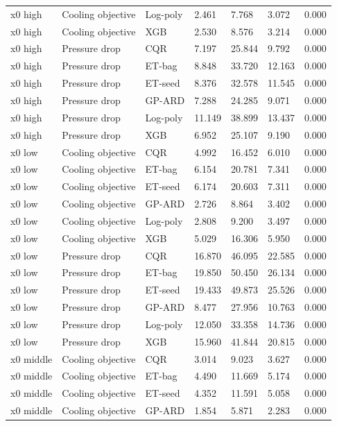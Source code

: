 \begin{longtable}{lllllll}
x0 high & Cooling objective & Log-poly & 2.461 & 7.768 & 3.072 & 0.000\\
x0 high & Cooling objective & XGB & 2.530 & 8.576 & 3.214 & 0.000\\
x0 high & Pressure drop & CQR & 7.197 & 25.844 & 9.792 & 0.000\\
x0 high & Pressure drop & ET-bag & 8.848 & 33.720 & 12.163 & 0.000\\
x0 high & Pressure drop & ET-seed & 8.376 & 32.578 & 11.545 & 0.000\\
x0 high & Pressure drop & GP-ARD & 7.288 & 24.285 & 9.071 & 0.000\\
x0 high & Pressure drop & Log-poly & 11.149 & 38.899 & 13.437 & 0.000\\
x0 high & Pressure drop & XGB & 6.952 & 25.107 & 9.190 & 0.000\\
x0 low & Cooling objective & CQR & 4.992 & 16.452 & 6.010 & 0.000\\
x0 low & Cooling objective & ET-bag & 6.154 & 20.781 & 7.341 & 0.000\\
x0 low & Cooling objective & ET-seed & 6.174 & 20.603 & 7.311 & 0.000\\
x0 low & Cooling objective & GP-ARD & 2.726 & 8.864 & 3.402 & 0.000\\
x0 low & Cooling objective & Log-poly & 2.808 & 9.200 & 3.497 & 0.000\\
x0 low & Cooling objective & XGB & 5.029 & 16.306 & 5.950 & 0.000\\
x0 low & Pressure drop & CQR & 16.870 & 46.095 & 22.585 & 0.000\\
x0 low & Pressure drop & ET-bag & 19.850 & 50.450 & 26.134 & 0.000\\
x0 low & Pressure drop & ET-seed & 19.433 & 49.873 & 25.526 & 0.000\\
x0 low & Pressure drop & GP-ARD & 8.477 & 27.956 & 10.763 & 0.000\\
x0 low & Pressure drop & Log-poly & 12.050 & 33.358 & 14.736 & 0.000\\
x0 low & Pressure drop & XGB & 15.960 & 41.844 & 20.815 & 0.000\\
x0 middle & Cooling objective & CQR & 3.014 & 9.023 & 3.627 & 0.000\\
x0 middle & Cooling objective & ET-bag & 4.490 & 11.669 & 5.174 & 0.000\\
x0 middle & Cooling objective & ET-seed & 4.352 & 11.591 & 5.058 & 0.000\\
x0 middle & Cooling objective & GP-ARD & 1.854 & 5.871 & 2.283 & 0.000\\

\end{longtable}
